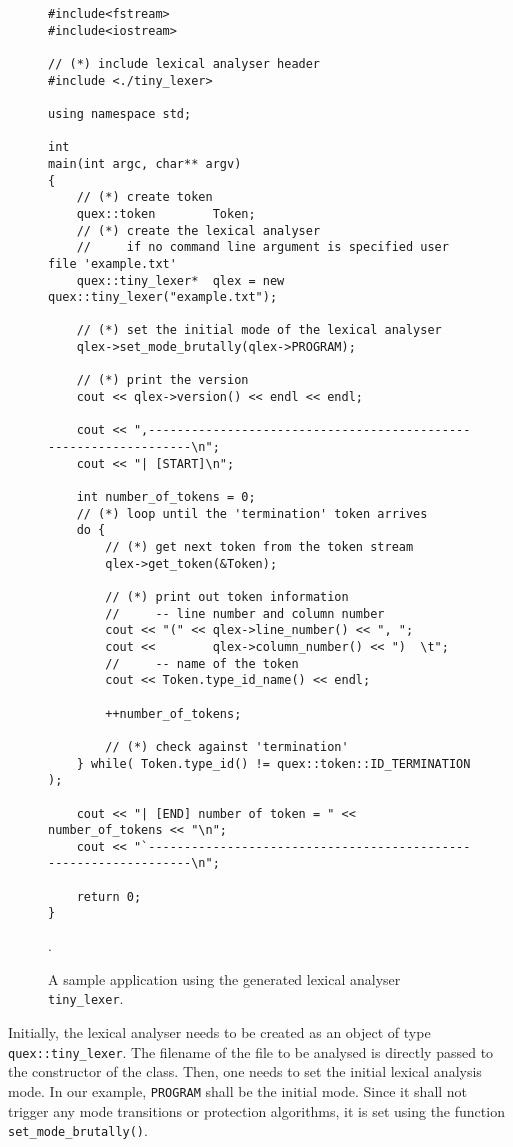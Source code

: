\begin{figure}
\begin{lstlisting}
#include<fstream>    
#include<iostream> 

// (*) include lexical analyser header
#include <./tiny_lexer>

using namespace std;

int 
main(int argc, char** argv) 
{        
    // (*) create token
    quex::token        Token;
    // (*) create the lexical analyser
    //     if no command line argument is specified user file 'example.txt'
    quex::tiny_lexer*  qlex = new quex::tiny_lexer("example.txt");

    // (*) set the initial mode of the lexical analyser
    qlex->set_mode_brutally(qlex->PROGRAM);

    // (*) print the version 
    cout << qlex->version() << endl << endl;

    cout << ",-----------------------------------------------------------------\n";
    cout << "| [START]\n";

    int number_of_tokens = 0;
    // (*) loop until the 'termination' token arrives
    do {
        // (*) get next token from the token stream
        qlex->get_token(&Token);

        // (*) print out token information
        //     -- line number and column number
        cout << "(" << qlex->line_number() << ", ";
        cout <<        qlex->column_number() << ")  \t";
        //     -- name of the token
        cout << Token.type_id_name() << endl;

        ++number_of_tokens;

        // (*) check against 'termination'
    } while( Token.type_id() != quex::token::ID_TERMINATION );

    cout << "| [END] number of token = " << number_of_tokens << "\n";
    cout << "`-----------------------------------------------------------------\n";

    return 0;
}
\end{lstlisting}
\caption{A sample application using the generated lexical analyser {\tt
    tiny\_lexer}.}
\label{ref:sample-application}.
\end{figure}

Initially, the lexical analyser needs to be created as an object of type {\tt
  quex::tiny\_lexer}. The filename of the file to be analysed is directly
passed to the constructor of the class. Then, one needs to set the initial
lexical analysis mode. In our example, {\tt PROGRAM} shall be the initial
mode. Since it shall not trigger any mode transitions or protection
algorithms, it is set using the function {\tt set\_mode\_brutally()}. 

